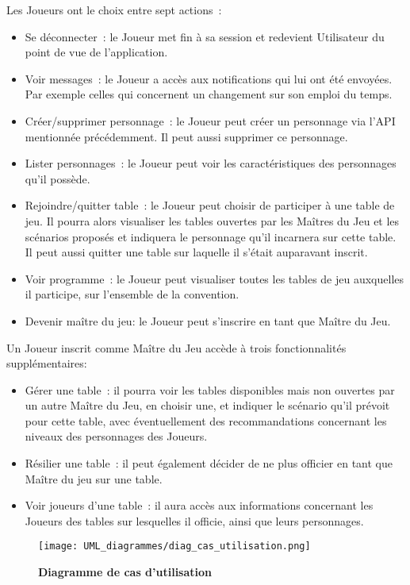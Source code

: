 \documentclass[11pt]{article}
\begin{document}
Les Joueurs ont le choix entre sept actions~:
\begin{itemize}
    \item {Se déconnecter~: le Joueur met fin à sa session et redevient Utilisateur du point de vue de l'application.}
    \item{Voir messages~: le Joueur a accès aux notifications qui lui ont été envoyées. Par exemple celles qui concernent un changement sur son emploi du temps.}
    \item{Créer/supprimer personnage~: le Joueur peut créer un personnage via l'API mentionnée précédemment. Il peut aussi supprimer ce personnage.}
    \item{Lister personnages~: le Joueur peut voir les caractéristiques des personnages qu'il possède.}
    \item{Rejoindre/quitter table~: le Joueur peut choisir de participer à une table de jeu. Il pourra alors visualiser les tables ouvertes par les Maîtres du Jeu et les scénarios proposés et indiquera le personnage qu'il incarnera sur cette table. Il peut aussi quitter une table sur laquelle il s'était auparavant inscrit.}
    \item{Voir programme~: le Joueur peut visualiser toutes les tables de jeu auxquelles il participe, sur l'ensemble de la convention.}
    \item{Devenir maître du jeu: le Joueur peut s'inscrire en tant que Maître du Jeu.\\}
\end{itemize}

Un Joueur inscrit comme Maître du Jeu accède à trois fonctionnalités supplémentaires:
\begin{itemize}
    \item{Gérer une table~: il pourra voir les tables disponibles mais non ouvertes par un autre Maître du Jeu, en choisir une, et indiquer le scénario qu'il prévoit pour cette table, avec éventuellement des recommandations concernant les niveaux des personnages des Joueurs.}
    \item{Résilier une table~: il peut également décider de ne plus officier en tant que Maître du jeu sur une table.}
    \item{Voir joueurs d'une table~: il aura accès aux informations concernant les Joueurs des tables sur lesquelles il officie, ainsi que leurs personnages.\\}
\end{itemize}

\begin{figure}[H]
    \caption{\textbf{Diagramme de cas d'utilisation}}
    \label{UML_classe_pipeline}
    \centering
    \texttt{[image: UML\_diagrammes/diag\_cas\_utilisation.png]}
\end{figure}
\end{document}
